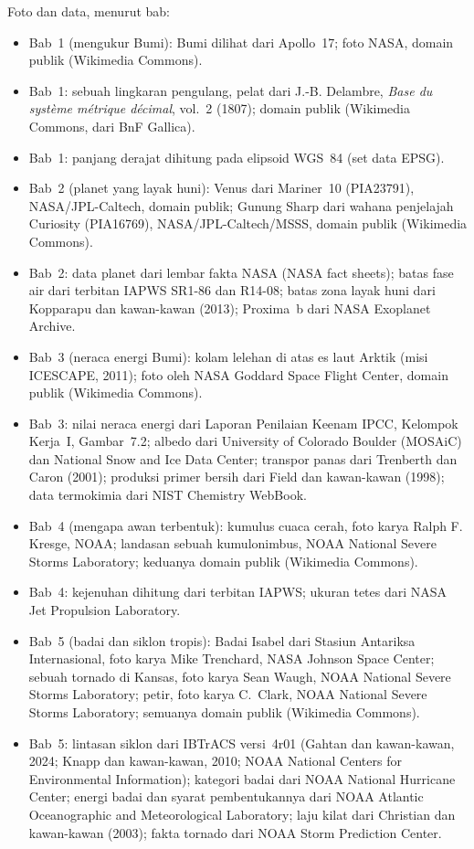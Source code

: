 \bigskip
\noindent Foto dan data, menurut bab:
\begin{itemize}\small
  \item Bab~1 (mengukur Bumi): Bumi dilihat dari Apollo~17; foto NASA, domain publik (Wikimedia Commons).
  \item Bab~1: sebuah lingkaran pengulang, pelat dari J.-B. Delambre, \emph{Base du système métrique décimal}, vol.~2 (1807); domain publik (Wikimedia Commons, dari BnF Gallica).
  \item Bab~1: panjang derajat dihitung pada elipsoid WGS~84 (set data EPSG).
  \item Bab~2 (planet yang layak huni): Venus dari Mariner~10 (PIA23791), NASA/JPL-Caltech, domain publik; Gunung Sharp dari wahana penjelajah Curiosity (PIA16769), NASA/JPL-Caltech/MSSS, domain publik (Wikimedia Commons).
  \item Bab~2: data planet dari lembar fakta NASA (NASA fact sheets); batas fase air dari terbitan IAPWS SR1-86 dan R14-08; batas zona layak huni dari Kopparapu dan kawan-kawan (2013); Proxima~b dari NASA Exoplanet Archive.
  \item Bab~3 (neraca energi Bumi): kolam lelehan di atas es laut Arktik (misi ICESCAPE, 2011); foto oleh NASA Goddard Space Flight Center, domain publik (Wikimedia Commons).
  \item Bab~3: nilai neraca energi dari Laporan Penilaian Keenam IPCC, Kelompok Kerja~I, Gambar~7.2; albedo dari University of Colorado Boulder (MOSAiC) dan National Snow and Ice Data Center; transpor panas dari Trenberth dan Caron (2001); produksi primer bersih dari Field dan kawan-kawan (1998); data termokimia dari NIST Chemistry WebBook.
  \item Bab~4 (mengapa awan terbentuk): kumulus cuaca cerah, foto karya Ralph F. Kresge, NOAA; landasan sebuah kumulonimbus, NOAA National Severe Storms Laboratory; keduanya domain publik (Wikimedia Commons).
  \item Bab~4: kejenuhan dihitung dari terbitan IAPWS; ukuran tetes dari NASA Jet Propulsion Laboratory.
  \item Bab~5 (badai dan siklon tropis): Badai Isabel dari Stasiun Antariksa Internasional, foto karya Mike Trenchard, NASA Johnson Space Center; sebuah tornado di Kansas, foto karya Sean Waugh, NOAA National Severe Storms Laboratory; petir, foto karya C.~Clark, NOAA National Severe Storms Laboratory; semuanya domain publik (Wikimedia Commons).
  \item Bab~5: lintasan siklon dari IBTrACS versi~4r01 (Gahtan dan kawan-kawan, 2024; Knapp dan kawan-kawan, 2010; NOAA National Centers for Environmental Information); kategori badai dari NOAA National Hurricane Center; energi badai dan syarat pembentukannya dari NOAA Atlantic Oceanographic and Meteorological Laboratory; laju kilat dari Christian dan kawan-kawan (2003); fakta tornado dari NOAA Storm Prediction Center.

\end{itemize}
